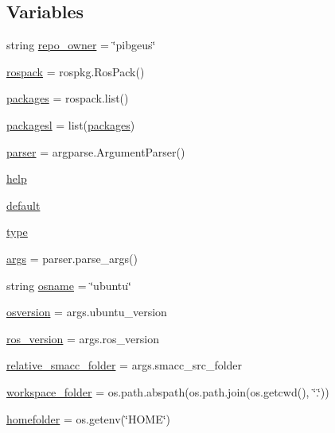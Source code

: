 \subsection*{Variables}
\begin{DoxyCompactItemize}
\item 
string \hyperlink{namespacegenerate__debs_a74472455382c9d55ee0d75c6df6bde74}{repo\+\_\+owner} = \char`\"{}pibgeus\char`\"{}
\item 
\hyperlink{namespacegenerate__debs_a609fa33c1ebbff173ec90524eeb7b49d}{rospack} = rospkg.\+Ros\+Pack()
\item 
\hyperlink{namespacegenerate__debs_a40d4732827c5678f3f48354238245e1d}{packages} = rospack.\+list()
\item 
\hyperlink{namespacegenerate__debs_acac340506bc1d8ca0d0881b9c00bfea2}{packagesl} = list(\hyperlink{namespacegenerate__debs_a40d4732827c5678f3f48354238245e1d}{packages})
\item 
\hyperlink{namespacegenerate__debs_a4a9ae4bb85fc62d7973ea3d09ced6c26}{parser} = argparse.\+Argument\+Parser()
\item 
\hyperlink{namespacegenerate__debs_ab09f4294da5036d5f6881672de9ed9c7}{help}
\item 
\hyperlink{namespacegenerate__debs_a3d67a92b7eb3a59c397dc9fdd1c67558}{default}
\item 
\hyperlink{namespacegenerate__debs_a50bc9a7ecac9584553e089a448bcde58}{type}
\item 
\hyperlink{namespacegenerate__debs_a75f9143e38df82d83b2e8a6f99cae02c}{args} = parser.\+parse\+\_\+args()
\item 
string \hyperlink{namespacegenerate__debs_ad06322332de29cb27a40152d0cccc2ca}{osname} = \char`\"{}ubuntu\char`\"{}
\item 
\hyperlink{namespacegenerate__debs_afd02fe6ead63bc5db5d3c3b9eb973b62}{osversion} = args.\+ubuntu\+\_\+version
\item 
\hyperlink{namespacegenerate__debs_af69f35c2a04a4cc8bd6b9805ab436872}{ros\+\_\+version} = args.\+ros\+\_\+version
\item 
\hyperlink{namespacegenerate__debs_abf6925bd06ac1da3981fe638eefb5a61}{relative\+\_\+smacc\+\_\+folder} = args.\+smacc\+\_\+src\+\_\+folder
\item 
\hyperlink{namespacegenerate__debs_acb69863b90257249a30e43ebacfb8bd8}{workspace\+\_\+folder} = os.\+path.\+abspath(os.\+path.\+join(os.\+getcwd(), \char`\"{}.\char`\"{}))
\item 
\hyperlink{namespacegenerate__debs_aeb83979be2939a8059435a906a91f682}{homefolder} = os.\+getenv(\char`\"{}H\+O\+ME\char`\"{})

\end{DoxyCompactItemize}
